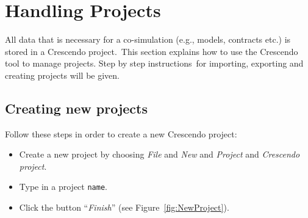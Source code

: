 \documentclass{crescendorepchap}
\begin{document}






\section{Handling Projects}

All data that is necessary for a co-simulation (e.g., models, contracts
etc.) is stored in a Crescendo project.~This section explains how to use
the Crescendo tool to manage projects. Step by step instructions~for
importing, exporting and creating projects will be given.

\subsection{Creating new projects}

Follow these steps in order to create a new Crescendo project:

\begin{itemize}
\item
  Create a new project by choosing \emph{File} and \emph{New} and
  \emph{Project} and \emph{Crescendo project}.
\item
  Type in a project \texttt{name}.
\item
  Click the button ``\emph{Finish}'' (see Figure~\ref{fig:NewProject}).
\end{itemize}
\end{document}
